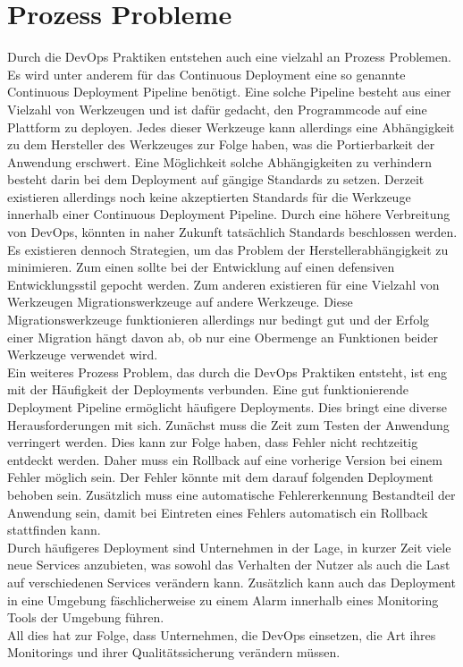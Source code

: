 \section{Prozess Probleme}
Durch die DevOps Praktiken entstehen auch eine vielzahl an Prozess Problemen. Es wird unter anderem für das Continuous Deployment eine so genannte Continuous Deployment Pipeline benötigt. Eine solche Pipeline besteht aus einer Vielzahl von Werkzeugen und ist dafür gedacht, den Programmcode auf eine Plattform zu deployen. Jedes dieser Werkzeuge kann allerdings eine Abhängigkeit zu dem Hersteller des Werkzeuges zur Folge haben, was die Portierbarkeit der Anwendung erschwert. Eine Möglichkeit solche Abhängigkeiten zu verhindern besteht darin bei dem Deployment auf gängige Standards zu setzen. Derzeit existieren allerdings noch keine akzeptierten Standards für die Werkzeuge innerhalb einer Continuous Deployment Pipeline. Durch eine höhere Verbreitung von DevOps, könnten in naher Zukunft tatsächlich Standards beschlossen werden. \\
Es existieren dennoch Strategien, um das Problem der Herstellerabhängigkeit zu minimieren. Zum einen sollte bei der Entwicklung auf einen defensiven Entwicklungsstil gepocht werden. Zum anderen existieren für eine Vielzahl von Werkzeugen Migrationswerkzeuge auf andere Werkzeuge. Diese Migrationswerkzeuge funktionieren allerdings nur bedingt gut und der Erfolg einer Migration hängt davon ab, ob nur eine Obermenge an Funktionen beider Werkzeuge verwendet wird. \\
Ein weiteres Prozess Problem, das durch die DevOps Praktiken entsteht, ist eng mit der Häufigkeit der Deployments verbunden. Eine gut funktionierende Deployment Pipeline ermöglicht häufigere Deployments. Dies bringt eine diverse Herausforderungen mit sich. Zunächst muss die Zeit zum Testen der Anwendung verringert werden. Dies kann zur Folge haben, dass Fehler nicht rechtzeitig entdeckt werden. Daher muss ein Rollback auf eine vorherige Version bei einem Fehler möglich sein. Der Fehler könnte mit dem darauf folgenden Deployment behoben sein. Zusätzlich muss eine automatische Fehlererkennung Bestandteil der Anwendung sein, damit bei Eintreten eines Fehlers automatisch ein Rollback stattfinden kann. \\
Durch häufigeres Deployment sind Unternehmen in der Lage, in kurzer Zeit viele neue Services anzubieten, was sowohl das Verhalten der Nutzer als auch die Last auf verschiedenen Services verändern kann. Zusätzlich kann auch das Deployment in eine Umgebung fäschlicherweise zu einem Alarm innerhalb eines Monitoring Tools der Umgebung führen. \\
All dies hat zur Folge, dass Unternehmen, die DevOps einsetzen, die Art ihres Monitorings und ihrer Qualitätssicherung verändern müssen.

